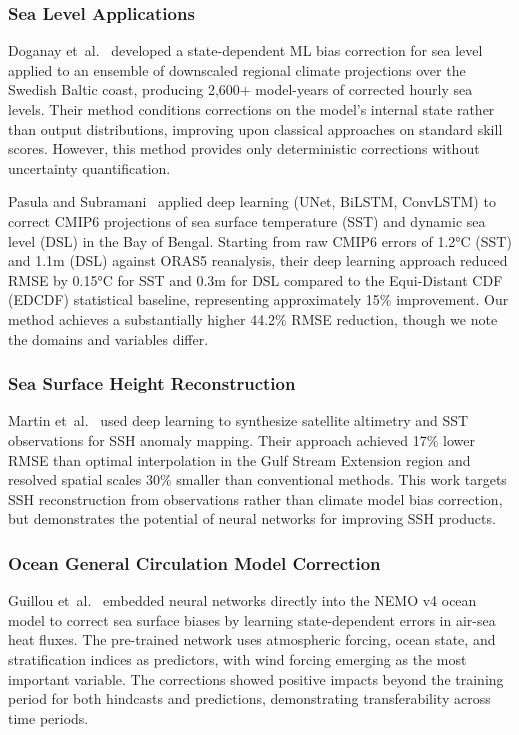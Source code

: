 \documentclass[conference]{IEEEtran}
\begin{document}
\subsubsection{Sea Level Applications}

Doganay et~al.~\cite{doganay2023} developed a state-dependent ML bias correction for sea level applied to an ensemble of downscaled regional climate projections over the Swedish Baltic coast, producing 2,600+ model-years of corrected hourly sea levels. Their method conditions corrections on the model's internal state rather than output distributions, improving upon classical approaches on standard skill scores. However, this method provides only deterministic corrections without uncertainty quantification.

Pasula and Subramani~\cite{pasula2025} applied deep learning (UNet, BiLSTM, ConvLSTM) to correct CMIP6 projections of sea surface temperature (SST) and dynamic sea level (DSL) in the Bay of Bengal. Starting from raw CMIP6 errors of 1.2°C (SST) and 1.1m (DSL) against ORAS5 reanalysis, their deep learning approach reduced RMSE by 0.15°C for SST and 0.3m for DSL compared to the Equi-Distant CDF (EDCDF) statistical baseline, representing approximately 15\% improvement. Our method achieves a substantially higher 44.2\% RMSE reduction, though we note the domains and variables differ.

\subsubsection{Sea Surface Height Reconstruction}

Martin et~al.~\cite{martin2023} used deep learning to synthesize satellite altimetry and SST observations for SSH anomaly mapping. Their approach achieved 17\% lower RMSE than optimal interpolation in the Gulf Stream Extension region and resolved spatial scales 30\% smaller than conventional methods. This work targets SSH reconstruction from observations rather than climate model bias correction, but demonstrates the potential of neural networks for improving SSH products.

\subsubsection{Ocean General Circulation Model Correction}

Guillou et~al.~\cite{guillou2025} embedded neural networks directly into the NEMO v4 ocean model to correct sea surface biases by learning state-dependent errors in air-sea heat fluxes. The pre-trained network uses atmospheric forcing, ocean state, and stratification indices as predictors, with wind forcing emerging as the most important variable. The corrections showed positive impacts beyond the training period for both hindcasts and predictions, demonstrating transferability across time periods.
\end{document}
